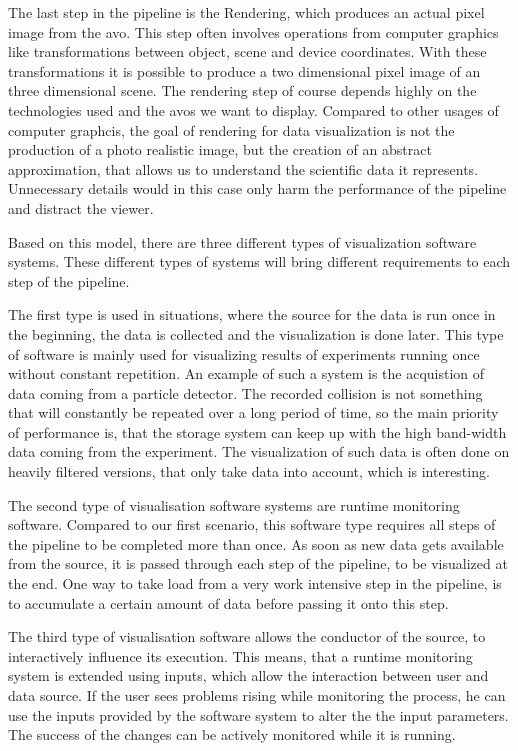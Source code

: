 The last step in the pipeline is the Rendering, which produces an actual pixel image from the \gls{avo}. This step often involves operations from computer graphics like transformations between object, scene and device coordinates. With these transformations it is possible to produce a two dimensional pixel image of an three dimensional scene. The rendering step of course depends highly on the technologies used and the \glspl{avo} we want to display. Compared to other usages of computer graphcis, the goal of rendering for data visualization is not the production of a photo realistic image, but the creation of an abstract approximation, that allows us to understand the scientific data it represents. Unnecessary details would in this case only harm the performance of the pipeline and distract the viewer.
\cite{VisIdioms, UnderstDataThroughVis}

Based on this model, there are three different types of visualization software systems. These different types of systems will bring different requirements to each step of the pipeline.

The first type is used in situations, where the source for the data is run once in the beginning, the data is collected and the visualization is done later. This type of software is mainly used for visualizing results of experiments running once without constant repetition. An example of such a system is the acquistion of data coming from a particle detector. The recorded collision is not something that will constantly be repeated over a long period of time, so the main priority of performance is, that the storage system can keep up with the high band-width data coming from the experiment. The visualization of such data is often done on heavily filtered versions, that only take data into account, which is interesting.

The second type of visualisation software systems are runtime monitoring software. Compared to our first scenario, this software type requires all steps of the pipeline to be completed more than once. As soon as new data gets available from the source, it is passed through each step of the pipeline, to be visualized at the end. One way to take load from a very work intensive step in the pipeline, is to accumulate a certain amount of data before passing it onto this step.

The third type of visualisation software allows the conductor of the source, to interactively influence its execution. This means, that a runtime monitoring system is extended using inputs, which allow the interaction between user and data source. If the user sees problems rising while monitoring the process, he can use the inputs provided by the software system to alter the the input parameters. The success of the changes can be actively monitored while it is running.
\cite{VisIdioms}


